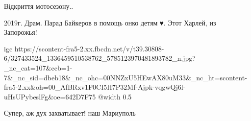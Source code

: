  
 
 
 
 

\qqSecCmt


Відкриття мотосезону..


2019г. Драм. Парад Байкеров в помощь онко детям🤝♥️. Этот Харлей, из Запорожья!

\ifcmt
  igc https://scontent-fra5-2.xx.fbcdn.net/v/t39.30808-6/327433524_1336459510538762_5785123970481893782_n.jpg?_nc_cat=107&ccb=1-7&_nc_sid=dbeb18&_nc_ohc=00NNZxU5HEwAX80uM33&_nc_ht=scontent-fra5-2.xx&oh=00_AfBRxv1F0CI5H7P32Mf-Ajpk-vqgwQj6l-uHsUPybeslFg&oe=642D7F75
	@width 0.5
\fi


Супер, аж дух захватывает! наш Мариуполь
